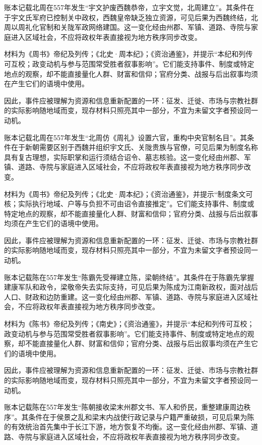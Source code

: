 账本记载北周在557年发生“宇文护废西魏恭帝，立宇文觉，北周建立”。其条件在于宇文氏军府已控制关中政权，西魏皇帝缺乏独立资源，可见后果为西魏终结，北周以周礼化官制和关陇军政网络建国。这一变化经由州郡、军镇、道路、寺院与家庭进入区域社会，不应将政权年表直接视为地方秩序同步改变。

材料为《周书》帝纪及列传；《北史·周本纪》；《资治通鉴》，并提示“本纪和列传可互校；政变动机与参与范围常受胜者叙事影响”。它们能支持事件、制度或特定地点的观察，却不能直接量化人群、财富和信仰；官府分类、战报与后出叙事均须在产生它们的语境中使用。

因此，事件应被理解为资源和信息重新配置的一环：征发、迁徙、市场与宗教社群的实际影响随地域而变，现存材料只照亮其中一部分，不宜为未留文字者预设同一动机。

账本记载北周在557年发生“北周仿《周礼》设置六官，重构中央官制名目”。其条件在于新朝需要区别于西魏并组织宇文氏、关陇贵族与官僚，可见后果为制度名称具有复古理想，实际职掌和运行须结合诏令、墓志核验。这一变化经由州郡、军镇、道路、寺院与家庭进入区域社会，不应将政权年表直接视为地方秩序同步改变。

材料为《周书》帝纪及列传；《北史·周本纪》；《资治通鉴》，并提示“制度条文可核；实际执行地域、户等与负担不可由诏令直接推定”。它们能支持事件、制度或特定地点的观察，却不能直接量化人群、财富和信仰；官府分类、战报与后出叙事均须在产生它们的语境中使用。

因此，事件应被理解为资源和信息重新配置的一环：征发、迁徙、市场与宗教社群的实际影响随地域而变，现存材料只照亮其中一部分，不宜为未留文字者预设同一动机。

账本记载陈在557年发生“陈霸先受禅建立陈，梁朝终结”。其条件在于陈霸先掌握建康军队和政令，梁敬帝失去实际支持，可见后果为陈成为江南新政权，面对战后人口、财政和边防重建。这一变化经由州郡、军镇、道路、寺院与家庭进入区域社会，不应将政权年表直接视为地方秩序同步改变。

材料为《陈书》帝纪及列传；《南史》；《资治通鉴》，并提示“本纪和列传可互校；政变动机与参与范围常受胜者叙事影响”。它们能支持事件、制度或特定地点的观察，却不能直接量化人群、财富和信仰；官府分类、战报与后出叙事均须在产生它们的语境中使用。

因此，事件应被理解为资源和信息重新配置的一环：征发、迁徙、市场与宗教社群的实际影响随地域而变，现存材料只照亮其中一部分，不宜为未留文字者预设同一动机。

账本记载陈在557年发生“陈朝接收梁末州郡文书、军人和侨民，重整建康周边秩序”。其条件在于侯景之乱和梁末内战使行政记录与户籍严重破损，可见后果为陈的有效统治首先集中于长江下游，地方恢复不均衡。这一变化经由州郡、军镇、道路、寺院与家庭进入区域社会，不应将政权年表直接视为地方秩序同步改变。

